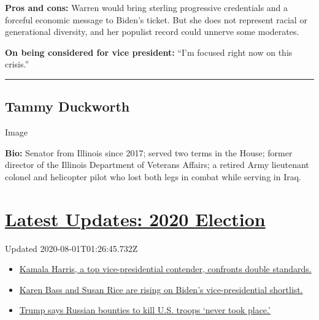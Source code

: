 \textbf{Pros and cons:} Warren would bring sterling progressive
credentials and a forceful economic message to Biden's ticket. But she
does not represent racial or generational diversity, and her populist
record could unnerve some moderates.

\textbf{On being considered for vice president:} ``I'm focused right now
on this crisis.''

\begin{center}\rule{0.5\linewidth}{\linethickness}\end{center}

\hypertarget{tammy-duckworth}{%
\subsection{Tammy Duckworth}\label{tammy-duckworth}}

Image

\textbf{Bio:} Senator from Illinois since 2017; served two terms in the
House; former director of the Illinois Department of Veterans Affairs; a
retired Army lieutenant colonel and helicopter pilot who lost both legs
in combat while serving in Iraq.

\hypertarget{latest-updates-2020-election}{%
\section{\texorpdfstring{\href{https://www.nytimes3xbfgragh.onion/2020/07/31/us/elections/biden-vs-trump.html?action=click\&pgtype=Article\&state=default\&region=MAIN_CONTENT_1\&context=storylines_live_updates}{Latest
Updates: 2020
Election}}{Latest Updates: 2020 Election}}\label{latest-updates-2020-election}}

Updated 2020-08-01T01:26:45.732Z

\begin{itemize}
\tightlist
\item
  \href{https://www.nytimes3xbfgragh.onion/2020/07/31/us/elections/biden-vs-trump.html?action=click\&pgtype=Article\&state=default\&region=MAIN_CONTENT_1\&context=storylines_live_updates\#link-29fdff45}{Kamala
  Harris, a top vice-presidential contender, confronts double
  standards.}
\item
  \href{https://www.nytimes3xbfgragh.onion/2020/07/31/us/elections/biden-vs-trump.html?action=click\&pgtype=Article\&state=default\&region=MAIN_CONTENT_1\&context=storylines_live_updates\#link-13ec3d9c}{Karen
  Bass and Susan Rice are rising on Biden's vice-presidential
  shortlist.}
\item
  \href{https://www.nytimes3xbfgragh.onion/2020/07/31/us/elections/biden-vs-trump.html?action=click\&pgtype=Article\&state=default\&region=MAIN_CONTENT_1\&context=storylines_live_updates\#link-49e9a016}{Trump
  says Russian bounties to kill U.S. troops `never took place.'}
\end{itemize}

